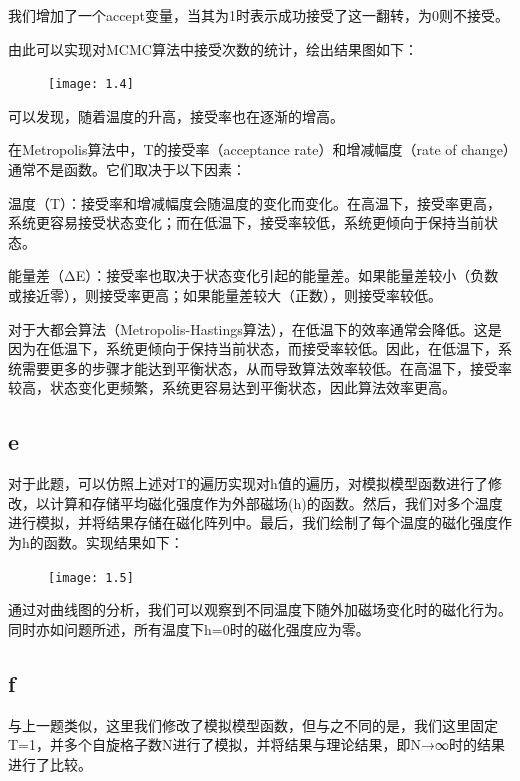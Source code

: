 \documentclass[UTF8]{ctexart}
\begin{document}
    我们增加了一个accept变量，当其为1时表示成功接受了这一翻转，为0则不接受。

    由此可以实现对MCMC算法中接受次数的统计，绘出结果图如下：

    \begin{figure}[h]
        \centering
        \texttt{[image: 1.4]}
        \label{fig:1.4}
    \end{figure}

    可以发现，随着温度的升高，接受率也在逐渐的增高。

    在Metropolis算法中，T的接受率（acceptance rate）和增减幅度（rate of change）通常不是函数。它们取决于以下因素：

    温度（T）：接受率和增减幅度会随温度的变化而变化。在高温下，接受率更高，系统更容易接受状态变化；而在低温下，接受率较低，系统更倾向于保持当前状态。

    能量差（ΔE）：接受率也取决于状态变化引起的能量差。如果能量差较小（负数或接近零），则接受率更高；如果能量差较大（正数），则接受率较低。

    对于大都会算法（Metropolis-Hastings算法），在低温下的效率通常会降低。这是因为在低温下，系统更倾向于保持当前状态，而接受率较低。因此，在低温下，系统需要更多的步骤才能达到平衡状态，从而导致算法效率较低。在高温下，接受率较高，状态变化更频繁，系统更容易达到平衡状态，因此算法效率更高。

    \subsection{e}\label{subsec:1.5}
    对于此题，可以仿照上述对T的遍历实现对h值的遍历，对模拟模型函数进行了修改，以计算和存储平均磁化强度作为外部磁场(h)的函数。然后，我们对多个温度进行模拟，并将结果存储在磁化阵列中。最后，我们绘制了每个温度的磁化强度作为h的函数。实现结果如下：
    \begin{figure}[h]
        \centering
        \texttt{[image: 1.5]}
        \label{fig:1.5}
    \end{figure}

    通过对曲线图的分析，我们可以观察到不同温度下随外加磁场变化时的磁化行为。同时亦如问题所述，所有温度下h=0时的磁化强度应为零。

    \subsection{f}\label{subsec:1.6}
    与上一题类似，这里我们修改了模拟模型函数，但与之不同的是，我们这里固定T=1，并多个自旋格子数N进行了模拟，并将结果与理论结果，即N→∞时的结果进行了比较。
\end{document}
